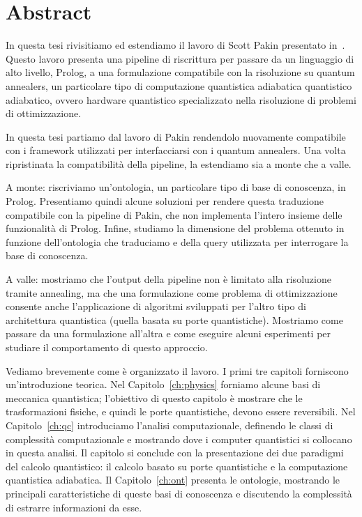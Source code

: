 
\chapter{Abstract}
In questa tesi rivisitiamo ed estendiamo il lavoro di Scott Pakin presentato in~\cite{pakin2018performing}. Questo lavoro presenta una pipeline di riscrittura per passare da un linguaggio di alto livello, Prolog, a una formulazione compatibile con la risoluzione su quantum annealers, un particolare tipo di computazione quantistica adiabatica quantistico adiabatico, ovvero hardware quantistico specializzato nella risoluzione di problemi di ottimizzazione.

In questa tesi partiamo dal lavoro di Pakin rendendolo nuovamente compatibile con i framework utilizzati per interfacciarsi con i quantum annealers. Una volta ripristinata la compatibilità della pipeline, la estendiamo sia a monte che a valle.

A monte: riscriviamo un'ontologia, un particolare tipo di base di conoscenza, in Prolog. Presentiamo quindi alcune soluzioni per rendere questa traduzione compatibile con la pipeline di Pakin, che non implementa l'intero insieme delle funzionalità di Prolog. Infine, studiamo la dimensione del problema ottenuto in funzione dell'ontologia che traduciamo e della query utilizzata per interrogare la base di conoscenza.

A valle: mostriamo che l'output della pipeline non è limitato alla risoluzione tramite annealing, ma che una formulazione come problema di ottimizzazione consente anche l'applicazione di algoritmi sviluppati per l'altro tipo di architettura quantistica (quella basata su porte quantistiche). Mostriamo come passare da una formulazione all'altra e come eseguire alcuni esperimenti per studiare il comportamento di questo approccio.

Vediamo brevemente come è organizzato il lavoro. I primi tre capitoli forniscono un'introduzione teorica. Nel Capitolo~\ref{ch:physics} forniamo alcune basi di meccanica quantistica; l'obiettivo di questo capitolo è mostrare che le trasformazioni fisiche, e quindi le porte quantistiche, devono essere reversibili. Nel Capitolo~\ref{ch:qc} introduciamo l'analisi computazionale, definendo le classi di complessità computazionale e mostrando dove i computer quantistici si collocano in questa analisi. Il capitolo si conclude con la presentazione dei due paradigmi del calcolo quantistico: il calcolo basato su porte quantistiche e la computazione quantistica adiabatica. Il Capitolo~\ref{ch:ont} presenta le ontologie, mostrando le principali caratteristiche di queste basi di conoscenza e discutendo la complessità di estrarre informazioni da esse. 

